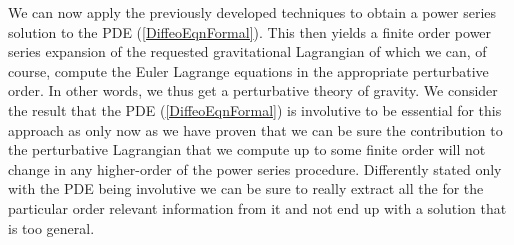 \documentclass[a4paper,12pt, DIV=14, BCOR=5mm, twoside, headsepline, numbers=noenddot]{scrbook}
\begin{document}
We can now apply the previously developed techniques to obtain a power series solution to the PDE (\ref{DiffeoEqnFormal}). This then yields a finite order power series expansion of the requested gravitational Lagrangian of which we can, of course, compute the Euler Lagrange equations in the appropriate perturbative order. In other words, we thus get a perturbative theory of gravity. We consider the result that the PDE (\ref{DiffeoEqnFormal}) is involutive to be essential for this approach as only now as we have proven that we can be sure the contribution to the perturbative Lagrangian that we compute up to some finite order will not change in any higher-order of the power series procedure. Differently stated only with the PDE being involutive we can be sure to really extract all the for the particular order relevant information from it and not end up with a solution that is too general. 
\end{document}

